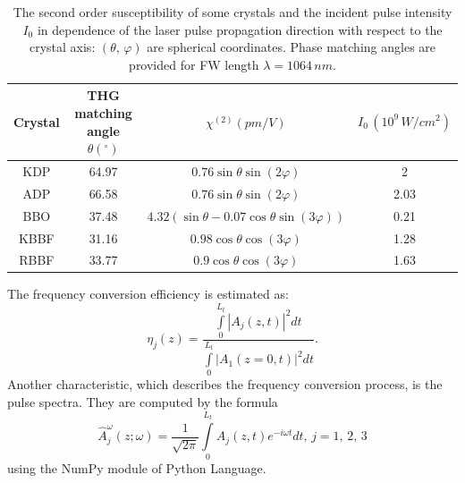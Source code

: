 \documentclass[a4paper, 12pt, onecolumn]{extarticle}
\begin{document}
\begin{table}[h]
\caption{The second order susceptibility of some crystals and the incident pulse intensity $I_0$ in dependence of the laser pulse propagation direction with respect to the crystal axis: \((\theta,\,\varphi)\) are spherical coordinates. Phase matching angles are provided for FW length $\lambda=1064\,nm$. }
{\begin{tabular}{|c|c|c|c|} 
\hline
Crystal& THG matching angle $\theta (^{\circ})$& $\chi^{(2)} (pm/V)$ & $ I_0\,(10^9\,W/cm^2)$ \\
\hline
KDP \cite{bib:n26,bib:c4}& 64.97 & $0.76\sin\theta\sin(2\varphi)$ & 2 \\
\hline
ADP \cite{bib:n26,bib:c4}& 66.58& $0.76\sin\theta\sin(2\varphi)$ & 2.03 \\
\hline
BBO \cite{bib:c1,bib:c4}& 37.48& $4.32(\sin\theta-0.07\cos\theta\sin(3\varphi))$ & 0.21 \\
\hline
KBBF \cite{bib:c2,bib:c5}& 31.16& $0.98\cos\theta\cos(3\varphi)$ & 1.28 \\
\hline
RBBF \cite{bib:c3}&33.77& $0.9\cos\theta\cos(3\varphi)$ & 1.63 \\
\hline
\end{tabular}
\label{tab:2}}
\end{table}


The frequency conversion efficiency is estimated as:
\begin{equation}
\eta_j(z)=\frac{\int\limits_0^{L_t}|A_j(z,t)|^2dt}{\int\limits_0^{L_t}|A_1(z=0,t)|^2dt}.
\end{equation}
Another characteristic, which describes the frequency conversion process, is the pulse spectra. They are computed by the formula
\begin{equation}
\hat{A}_j^\omega(z;\omega)=\frac{1}{\sqrt{2\pi}}\int\limits_{0}^{L_t} A_j(z,t)e^{-i\omega t}dt,\,j=1,\,2,\,3
\end{equation}
using the NumPy module \cite{bib:np} of Python Language. 
\end{document}
